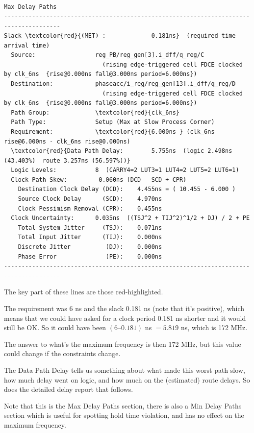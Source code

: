 \documentclass[12pt, a4paper]{article}
\begin{document}
\begin{Verbatim}[commandchars=\\\{\}]
    

Max Delay Paths
--------------------------------------------------------------------------------------
Slack \textcolor{red}{(MET) :             0.181ns}  (required time - arrival time)
  Source:                 reg_PB/reg_gen[3].i_dff/q_reg/C
                            (rising edge-triggered cell FDCE clocked by clk_6ns  {rise@0.000ns fall@3.000ns period=6.000ns})
  Destination:            phaseacc/i_reg/reg_gen[13].i_dff/q_reg/D
                            (rising edge-triggered cell FDCE clocked by clk_6ns  {rise@0.000ns fall@3.000ns period=6.000ns})
  Path Group:             \textcolor{red}{clk_6ns}
  Path Type:              Setup (Max at Slow Process Corner)
  Requirement:            \textcolor{red}{6.000ns } (clk_6ns rise@6.000ns - clk_6ns rise@0.000ns)
  \textcolor{red}{Data Path Delay:        5.755ns  (logic 2.498ns (43.403%)  route 3.257ns (56.597%))}
  Logic Levels:           8  (CARRY4=2 LUT3=1 LUT4=2 LUT5=2 LUT6=1)
  Clock Path Skew:        -0.060ns (DCD - SCD + CPR)
    Destination Clock Delay (DCD):    4.455ns = ( 10.455 - 6.000 ) 
    Source Clock Delay      (SCD):    4.970ns
    Clock Pessimism Removal (CPR):    0.455ns
  Clock Uncertainty:      0.035ns  ((TSJ^2 + TIJ^2)^1/2 + DJ) / 2 + PE
    Total System Jitter     (TSJ):    0.071ns
    Total Input Jitter      (TIJ):    0.000ns
    Discrete Jitter          (DJ):    0.000ns
    Phase Error              (PE):    0.000ns
--------------------------------------------------------------------------------------
\end{Verbatim}


The key part of these lines are those red-highlighted.

The requirement was 6 ns and the slack 0.181 ns (note that it’s positive), which means that we could have asked for a clock period 0.181 ns shorter and it would still be OK. So it could have been $(6– 0.181)$ ns $ = 5.819$ ns, which is 172 MHz.

The answer to what's the maximum frequency is then 172 MHz, but this value could change if the constraints change.

The Data Path Delay tells us something about what made this worst path slow, how much delay went on logic, and how much on the (estimated) route delays. So does the detailed delay report that follows.
\newline

Note that this is the Max Delay Paths section, there is also a Min Delay Paths section which is useful for spotting hold time violation, and has no effect on the maximum frequency.
\end{document}
